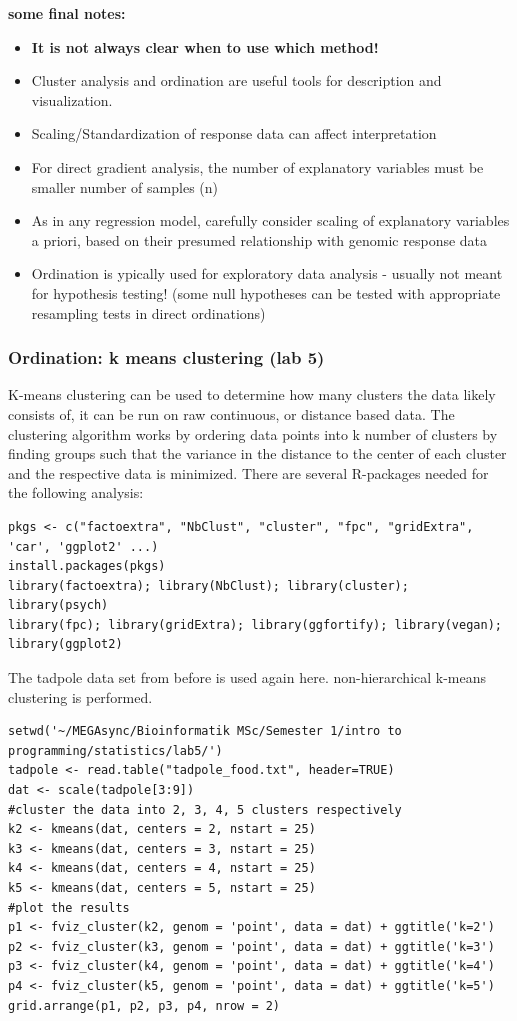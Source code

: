 \documentclass{article}
\begin{document}
\textbf{some final notes:}
\begin{itemize}
    \item \textbf{  It is not always clear when to use which method!}
    \item Cluster analysis and ordination are useful tools for description and visualization.
    \item Scaling/Standardization of response data can affect interpretation
    \item For direct gradient analysis, the number of explanatory variables must be smaller number of samples (n)
    \item As in any regression model, carefully consider scaling of explanatory variables a priori, based on their presumed relationship with genomic response data
    \item Ordination is ypically used for exploratory data analysis - usually not meant for hypothesis testing! (some null hypotheses can be tested with appropriate resampling tests in direct ordinations)
\end{itemize}


\subsubsection{Ordination: k means clustering (lab 5)}
K-means clustering can be used to determine how many clusters the data likely consists of, it can be run on raw continuous, or distance based data. The clustering algorithm works by ordering data points into k number of clusters by finding groups such that the variance in the distance to the center of each cluster and the respective data is minimized. There are several R-packages needed for the following analysis:
\begin{lstlisting}
pkgs <- c("factoextra", "NbClust", "cluster", "fpc", "gridExtra", 'car', 'ggplot2' ...)
install.packages(pkgs)
library(factoextra); library(NbClust); library(cluster); library(psych)
library(fpc); library(gridExtra); library(ggfortify); library(vegan); library(ggplot2)
\end{lstlisting}
The tadpole data set from before is used again here. non-hierarchical k-means clustering is performed.

\begin{lstlisting}
setwd('~/MEGAsync/Bioinformatik MSc/Semester 1/intro to programming/statistics/lab5/')
tadpole <- read.table("tadpole_food.txt", header=TRUE)
dat <- scale(tadpole[3:9])
#cluster the data into 2, 3, 4, 5 clusters respectively
k2 <- kmeans(dat, centers = 2, nstart = 25)
k3 <- kmeans(dat, centers = 3, nstart = 25)
k4 <- kmeans(dat, centers = 4, nstart = 25)
k5 <- kmeans(dat, centers = 5, nstart = 25)
#plot the results
p1 <- fviz_cluster(k2, genom = 'point', data = dat) + ggtitle('k=2')
p2 <- fviz_cluster(k3, genom = 'point', data = dat) + ggtitle('k=3')
p3 <- fviz_cluster(k4, genom = 'point', data = dat) + ggtitle('k=4')
p4 <- fviz_cluster(k5, genom = 'point', data = dat) + ggtitle('k=5')
grid.arrange(p1, p2, p3, p4, nrow = 2)
\end{lstlisting}
\end{document}

